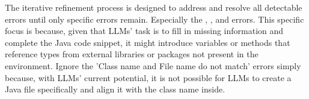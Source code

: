 

The iterative refinement process is designed to address and resolve all detectable errors until only specific errors remain. Especially the , , and  errors.
This specific focus is because, given that LLMs' task is to fill in missing information and complete the Java code snippet, it might introduce variables or methods that reference types from external libraries or packages not present in the environment.
Ignore the 'Class name and File name do not match' errors simply because, with LLMs' current potential, it is not possible for LLMs to create a Java file specifically and align it with the class name inside.




